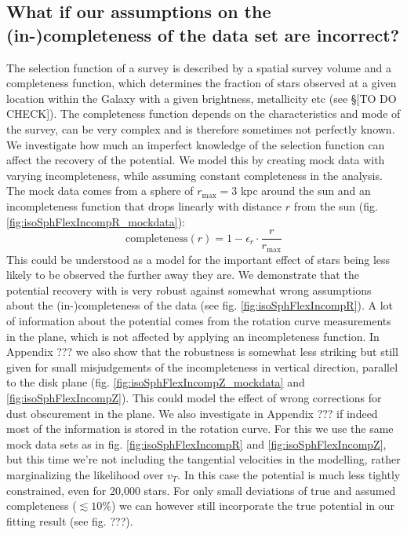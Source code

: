 \subsection{What if our assumptions on the (in-)completeness of the data set are incorrect?}

The selection function of a survey is described by a spatial survey volume and a completeness function, which determines the fraction of stars observed at a given location within the Galaxy with a given brightness, metallicity etc (see \S[TO DO CHECK]). The completeness function depends on the characteristics and mode of the survey, can be very complex and is therefore sometimes not perfectly known. We investigate how much an imperfect knowledge of the selection function can affect the recovery of the potential. We model this by creating mock data with varying incompleteness, while assuming constant completeness in the analysis. The mock data comes from a sphere of $r_\text{max} = 3$ kpc around the sun and an incompleteness function that drops linearly with distance $r$ from the sun (fig. \ref{fig:isoSphFlexIncompR_mockdata}):
\begin{equation*}
\text{completeness}(r) = 1 − \epsilon_r \cdot \frac{r}{r_\text{max}}
\end{equation*}
This could be understood as a model for the important effect of stars being less likely to be observed the further away they are. We demonstrate that the potential recovery with \RM is very robust against somewhat wrong assumptions about the (in-)completeness of the data (see fig. \ref{fig:isoSphFlexIncompR}). A lot of information about the potential comes from the rotation curve measurements in the plane, which is not affected by applying an incompleteness function. In Appendix ??? we also show that the robustness is somewhat less striking but still given for small misjudgements of the incompleteness in vertical direction, parallel to the disk plane (fig. \ref{fig:isoSphFlexIncompZ_mockdata} and \ref{fig:isoSphFlexIncompZ}). This could model the effect of wrong corrections for dust obscurement in the plane. We also investigate in Appendix ??? if indeed most of the information is stored in the rotation curve. For this we use the same mock data sets as in fig. \ref{fig:isoSphFlexIncompR} and \ref{fig:isoSphFlexIncompZ}, but this time we’re not including the tangential velocities in the modelling, rather marginalizing the likelihood over $v_T$. In this case the potential is much less tightly constrained, even for 20,000 stars. For only small deviations of true and assumed completeness ($\lesssim 10\%$) we can however still incorporate the true potential in our fitting result (see fig. ???). 

